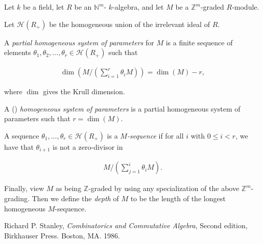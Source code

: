 \documentclass[12pt]{article}
\newcommand{\mb}{\mathbb}
\newcommand{\Z}{\mb{Z}}
\newcommand{\<}{\langle}
\renewcommand{\>}{\rangle}
\begin{document}
Let $k$ be a field, let $R$ be an $\mb{N}^m$- $k$-algebra, and let $M$ be a $\Z^m$-graded $R$-module.

Let $\mathcal{H}(R_+)$ be the homogeneous union of the irrelevant ideal of $R$.

A \emph{partial homogeneous system of parameters} for $M$ is a finite sequence of elements $\theta_1, \theta_2, \ldots, \theta_r\in\mathcal{H}(R_+)$ such that 

\begin{align*}
\dim\left(M/\left(\sum_{i=1}^r \theta_iM\right)\right)=\dim(M)-r,
\end{align*}

where $\dim$ gives the Krull dimension.

A () \emph{homogeneous system of parameters} is a partial homogeneous system of parameters such that $r=\dim(M)$.

A sequence $\theta_1,\ldots,\theta_r\in\mathcal{H}(R_+)$ is a \emph{ $M$-sequence} if for all $i$ with $0\leq i<r$, we have that $\theta_{i+1}$ is not a zero-divisor in 

\begin{align*}
M/\left(\sum_{j=1}^i \theta_iM\right).
\end{align*}

Finally, view $M$ as being $\Z$-graded by using any specialization of the above $\Z^m$-grading.  Then we define the \emph{depth} of $M$ to be the length of the longest homogeneous $M$-sequence.

\begin{thebibliography}{9}
 Richard P. Stanley, {\em Combinatorics and Commutative Algebra}, Second edition, Birkhauser Press.  Boston, MA.  1986.
\end{thebibliography}
\end{document}

